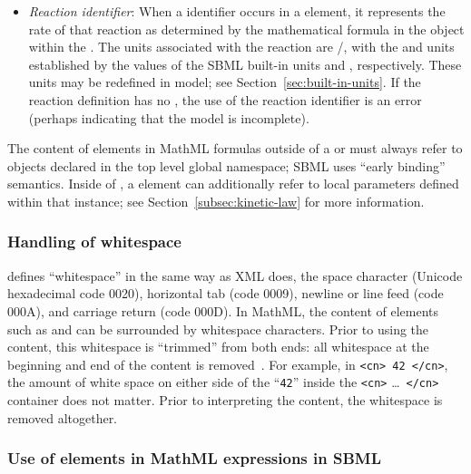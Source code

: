 \begin{itemize}
\begin{itemize}
  \item \emph{Reaction identifier}: When a \Reaction identifier
    occurs in a  element, it represents the rate of that
    reaction as determined by the mathematical formula in the
    \KineticLaw object within the \Reaction.  The units associated
    with the reaction are /,
    with the  and  units
    established by the values of the SBML built-in units
     and , respectively.  These units may
    be redefined in model; see Section~\ref{sec:built-in-units}.
    If the reaction definition has no \KineticLaw, the use of the
    reaction identifier is an error (perhaps indicating that the
    model is incomplete).

  \end{itemize}

\end{itemize}

The content of  elements in MathML formulas outside of a
\KineticLaw or \FunctionDefinition must always refer to objects
declared in the top level global namespace; \ie SBML uses ``early
binding'' semantics.  Inside of \KineticLaw, a  element
can additionally refer to local parameters defined within that
\KineticLaw instance; see Section~\ref{subsec:kinetic-law} for
more information.


\subsubsection{Handling of whitespace}
\label{sec:mathml-whitespace}

\mathmltwo defines ``whitespace'' in the same way as XML does, \ie
the space character (Unicode hexadecimal code 0020), horizontal
tab (code 0009), newline or line feed (code 000A), and carriage
return (code 000D).  In MathML, the content of elements such as
 and  can be surrounded by whitespace
characters.  Prior to using the content, this whitespace is
``trimmed'' from both ends: all whitespace at the beginning and
end of the content is removed~\citep{ausbrooks:2003}.  For
example, in \texttt{<cn> 42 </cn>}, the amount of white space on
either side of the ``\texttt{42}'' inside the \texttt{<cn>}
\ldots\ \texttt{</cn>} container does not matter.  Prior to
interpreting the content, the whitespace is removed altogether.


\subsubsection{Use of  elements in MathML expressions in SBML}
\label{sec:csymbol-token}

